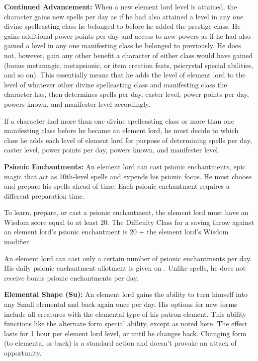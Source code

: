 {
\textbf{Continued Advancement:} When a new element lord level is attained, the character gains new spells per day as if he had also attained a level in any one divine spellcasting class he belonged to before he added the prestige class. He gains additional power points per day and access to new powers as if he had also gained a level in any one manifesting class he belonged to previously. He does not, however, gain any other benefit a character of either class would have gained (bonus metamagic, metapsionic, or item creation feats, psicrystal special abilities, and so on). This essentially means that he adds the level of element lord to the level of whatever other divine spellcasting class and manifesting class the character has, then determines spells per day, caster level, power points per day, powers known, and manifester level accordingly.

If a character had more than one divine spellcasting class or more than one manifesting class before he became an element lord, he must decide to which class he adds each level of element lord for purpose of determining spells per day, caster level, power points per day, powers known, and manifester level.

\textbf{Psionic Enchantments:} An element lord can cast psionic enchantments, epic magic that act as 10th-level spells and expends his psionic focus. He must choose and prepare his spells ahead of time. Each psionic enchantment requires a different preparation time.

To learn, prepare, or cast a psionic enchantment, the element lord must have an Wisdom score equal to at least 20. The Difficulty Class for a saving throw against an element lord's psionic enchantment is 20 + the element lord's Wisdom modifier.

An element lord can cast only a certain number of psionic enchantments per day. His daily psionic enchantment allotment is given on . Unlike spells, he does not receive bonus psionic enchantments per day.

\textbf{Elemental Shape (Su):} An element lord gains the ability to turn himself into any Small elemental and back again once per day. His options for new forms include all creatures with the elemental type of his patron element. This ability functions like the alternate form special ability, except as noted here. The effect lasts for 1 hour per element lord level, or until he changes back. Changing form (to elemental or back) is a standard action and doesn't provoke an attack of opportunity.

}
